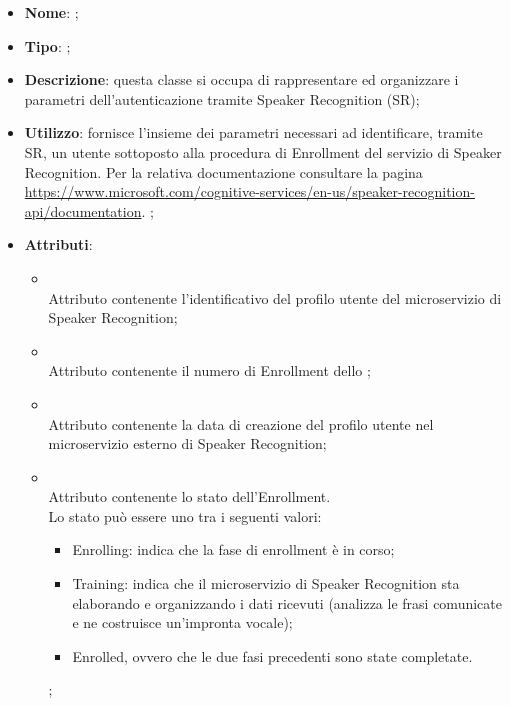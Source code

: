 \begin{itemize}
	\item \textbf{Nome}: ;
	\item \textbf{Tipo}: ;
	\item \textbf{Descrizione}: questa classe si occupa di rappresentare ed organizzare i parametri dell'autenticazione tramite Speaker Recognition (SR);
	\item \textbf{Utilizzo}: fornisce l'insieme dei parametri necessari ad identificare, tramite SR, un utente sottoposto alla procedura di Enrollment del servizio di Speaker Recognition.
Per la relativa documentazione consultare la pagina \url{https://www.microsoft.com/cognitive-services/en-us/speaker-recognition-api/documentation}.
;
	\item \textbf{Attributi}:
	\begin{itemize}
		\item[]  \\
		Attributo contenente l'identificativo del profilo utente del microservizio di Speaker Recognition;
		\item[]  \\
		Attributo contenente il numero di Enrollment dello ;
		\item[]  \\
		Attributo contenente la data di creazione del profilo utente nel microservizio esterno di Speaker Recognition;
		\item[]  \\
		Attributo contenente lo stato dell'Enrollment.\\
Lo stato può essere uno tra i seguenti valori:
\begin{itemize} \item Enrolling: indica che la fase di enrollment è in corso; \item Training: indica che il microservizio di Speaker Recognition sta elaborando e organizzando i dati ricevuti (analizza le frasi comunicate e ne costruisce un'impronta vocale); \item Enrolled, ovvero che le due fasi precedenti sono state completate. \end{itemize};
	\end{itemize}
\end{itemize}

